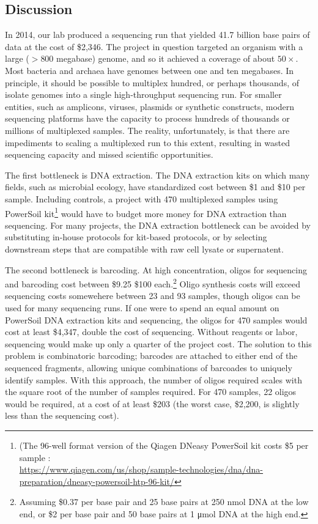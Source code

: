 \begin{refsection}
\section{Discussion}

In 2014, our lab produced a sequencing run that yielded 41.7 billion base pairs of data at the cost of \$2,346. The project in question targeted an organism with a large ($>800$ megabase) genome, and so it achieved a coverage of about $50\times$. Most bacteria and archaea have genomes between one and ten megabases. In principle, it should be possible to multiplex hundred, or perhaps thousands, of isolate genomes into a single high-throughput sequencing run. For smaller entities, such as amplicons, viruses, plasmids or synthetic constructs, modern sequencing platforms have the capacity to process hundreds of thousands or millions of multiplexed samples. The reality, unfortunately, is that there are impediments to scaling a multiplexed run to this extent, resulting in wasted sequencing capacity and missed scientific opportunities.

The first bottleneck is DNA extraction. The DNA extraction kits on which many fields, such as microbial ecology, have standardized cost between \$1 and \$10 per sample. Including controls, a project with 470 multiplexed samples using PowerSoil kit\footnote{(The 96-well format version of the Qiagen DNeasy PowerSoil kit costs \$5 per sample :\\ \url{https://www.qiagen.com/us/shop/sample-technologies/dna/dna-preparation/dneasy-powersoil-htp-96-kit/}} would have to budget more money for DNA extraction than sequencing. For many projects, the DNA extraction bottleneck can be avoided by substituting in-house protocols for kit-based protocols, or by selecting downstream steps that are compatible with raw cell lysate or supernatent.

The second bottleneck is barcoding. At high concentration, oligos for sequencing and barcoding cost between \$9.25 \$100 each.\footnote{Assuming \$0.37 per base pair and 25 base pairs at 250 \si{\nano\mole} DNA at the low end, or \$2 per base pair and 50 base pairs at 1 \si{\micro\mole} DNA at the high end.} Oligo synthesis costs will exceed sequencing costs somewehere between 23 and 93 samples, though oligos can be used for many sequencing runs. If one were to spend an equal amount on PowerSoil DNA extraction kits and sequencing, the oligos for 470 samples would cost at least \$4,347, double the cost of sequencing. Without reagents or labor, sequencing would make up only a quarter of the project cost. The solution to this problem is combinatoric barcoding; barcodes are attached to either end of the sequenced fragments, allowing unique combinations of barcoades to uniquely identify samples. With this approach, the number of oligos required scales with the square root of the number of samples required. For 470 samples, 22 oligos would be required, at a cost of at least \$203 (the worst case, \$2,200, is slightly less than the sequencing cost).


\end{refsection}
